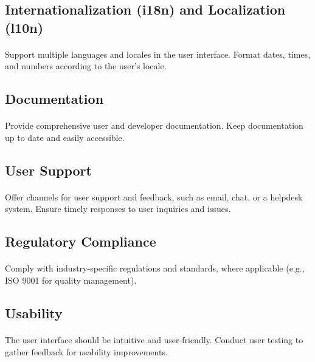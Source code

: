 \documentclass{article}
\begin{document}
\subsection{Internationalization (i18n) and Localization (l10n)}
\paragraph{}
Support multiple languages and locales in the user interface.
Format dates, times, and numbers according to the user's locale.

\subsection{Documentation}
\paragraph{}
Provide comprehensive user and developer documentation.
Keep documentation up to date and easily accessible.

\subsection{User Support}
\paragraph{}
Offer channels for user support and feedback, such as email, chat, or a helpdesk system.
Ensure timely responses to user inquiries and issues.

\subsection{Regulatory Compliance}
\paragraph{}
Comply with industry-specific regulations and standards, where applicable (e.g., ISO 9001 for quality management).

\subsection{Usability}
\paragraph{}
The user interface should be intuitive and user-friendly.
Conduct user testing to gather feedback for usability improvements.
\end{document}

